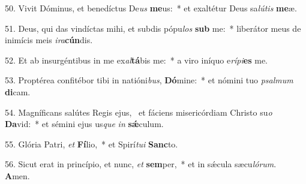 50. Vivit Dóminus, et benedíctus De\textit{us} \textbf{me}us:~*  et exaltétur Deus sa\textit{lú}\textit{tis} \textbf{me}æ.\

51. Deus, qui das vindíctas mihi, et subdis pópu\textit{los} \textbf{sub} me:~*  liberátor meus de inimícis meis \textit{i}\textit{ra}\textbf{cún}dis.\

52. Et ab insurgéntibus in me ex\textit{al}\textbf{tá}bis me:~*  a viro iníquo e\textit{rí}\textit{pi}\textbf{es} me.\

53. Proptérea confitébor tibi in natióni\textit{bus}, \textbf{Dó}mine:~*  et nómini tuo \textit{psal}\textit{mum} \textbf{di}cam.\

54. Magníficans salútes Regis ejus, \dag\  et fáciens misericórdiam Christo su\textit{o} \textbf{Da}vid:~*  et sémini ejus us\textit{que} \textit{in} \textbf{sǽ}culum.\

55. Glória Patri, \textit{et} \textbf{Fí}lio,~*  et Spirí\textit{tu}\textit{i} \textbf{Sanc}to.\

56. Sicut erat in princípio, et nunc, \textit{et} \textbf{sem}per,~*  et in sǽcula sæcu\textit{ló}\textit{rum}. \textbf{A}men.\

